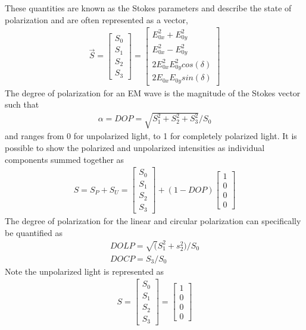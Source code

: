 These quantities are known as the Stokes parameters and describe the state of polarization and are often represented as a vector,
%
\begin{align}
    \vec{S} =
    \begin{bmatrix}
        S_0 \\
        S_1 \\
        S_2 \\
        S_3
    \end{bmatrix}
    =
    \begin{bmatrix}
        E_{0x}^2+E_{0y}^2 \\
        E_{0x}^2-E_{0y}^2 \\
        2E_{0x}^2 E_{0y}^2 cos(\delta) \\
        2E_{0x} E_{0y}  sin(\delta)
    \end{bmatrix}
\end{align}
%
The degree of polarization for an EM wave is the magnitude of the Stokes vector such that
%
\begin{align}
    \alpha =DOP=  \sqrt{S_1^2+S_2^2+S_3^2 }/S_0
\end{align}
%
and ranges from 0 for unpolarized light, to 1 for completely polarized light.  It is possible to show the polarized and unpolarized intensities as individual components
summed together as
%
\begin{align}
    S=S_P+S_U=
    \begin{bmatrix}
        S_0 \\
        S_1 \\
        S_2 \\
        S_3
    \end{bmatrix}
    +(1-DOP)
    \begin{bmatrix}
        1 \\
        0 \\
        0 \\
        0
    \end{bmatrix}
\end{align}
%
The degree of polarization for the linear and circular polarization can specifically be quantified as
%
\begin{align}
    DOLP=  \sqrt(S_1^2+s_2^2 )/S_0 \\
    DOCP=  S_3/S_0
\end{align}
%
Note the unpolarized light is represented as
%
\begin{align}
    S=
    \begin{bmatrix}
        S_0 \\
        S_1 \\
        S_2 \\
        S_3
    \end{bmatrix}
    =
    \begin{bmatrix}
        1 \\
        0 \\
        0 \\
        0
    \end{bmatrix}
\end{align}
